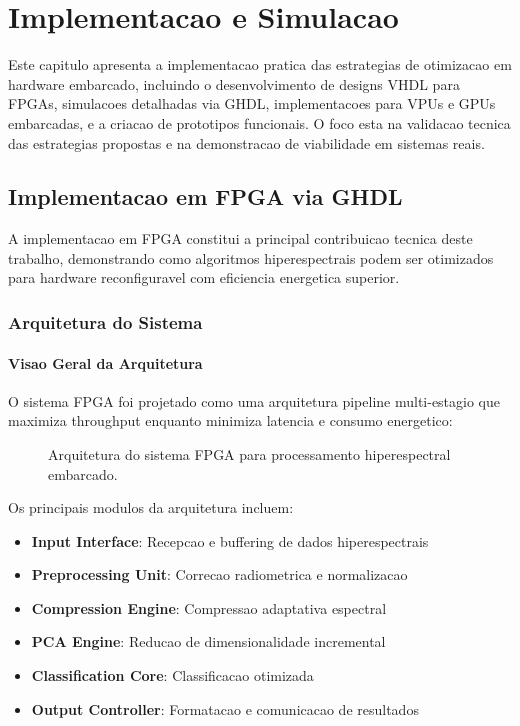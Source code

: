 \chapter{Implementacao e Simulacao}\label{chp:simulacao}

Este capitulo apresenta a implementacao pratica das estrategias de otimizacao em hardware embarcado, incluindo o desenvolvimento de designs VHDL para FPGAs, simulacoes detalhadas via GHDL, implementacoes para VPUs e GPUs embarcadas, e a criacao de prototipos funcionais. O foco esta na validacao tecnica das estrategias propostas e na demonstracao de viabilidade em sistemas reais.

\section{Implementacao em FPGA via GHDL}\label{sec:implementacao_fpga}

A implementacao em FPGA constitui a principal contribuicao tecnica deste trabalho, demonstrando como algoritmos hiperespectrais podem ser otimizados para hardware reconfiguravel com eficiencia energetica superior.

\subsection{Arquitetura do Sistema}

\subsubsection{Visao Geral da Arquitetura}
O sistema FPGA foi projetado como uma arquitetura pipeline multi-estagio que maximiza throughput enquanto minimiza latencia e consumo energetico:

\begin{figure}[!htb]
\centering
\caption[Arquitetura FPGA]{Arquitetura do sistema FPGA para processamento hiperespectral embarcado.}
\label{fig:fpga_architecture}
\end{figure}

Os principais modulos da arquitetura incluem:
\begin{itemize}
    \item \textbf{Input Interface}: Recepcao e buffering de dados hiperespectrais
    \item \textbf{Preprocessing Unit}: Correcao radiometrica e normalizacao
    \item \textbf{Compression Engine}: Compressao adaptativa espectral
    \item \textbf{PCA Engine}: Reducao de dimensionalidade incremental
    \item \textbf{Classification Core}: Classificacao otimizada
    \item \textbf{Output Controller}: Formatacao e comunicacao de resultados
\end{itemize}

